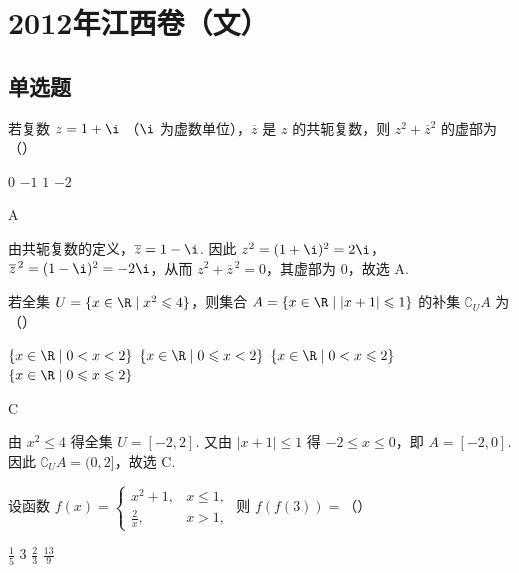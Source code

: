 \chapter{2012年江西卷（文）}

\section{单选题}

\begin{problem}
若复数 \(z = 1 + \i\) （\(\i\) 为虚数单位），\(\overline{z}\) 是 \(z\) 的共轭复数，则 \(z^2 + \overline{z}^2\) 的虚部为（\quad）

\choices
    {\(0\)}
    {\(-1\)}
    {\(1\)}
    {\(-2\)}
\end{problem}

\begin{answer}
A
\end{answer}

\begin{solution}
由共轭复数的定义，\(\overline{z}=1-\i\). 因此
\(z^2=(1+\i)^2=2\i\)，\(\overline{z}^{\,2}=(1-\i)^2=-2\i\)，从而
\(z^2+\overline{z}^{\,2}=0\)，其虚部为 \(0\)，故选 A.
\end{solution}

\begin{problem}
若全集 \(U = \{x \in \R \mid x^2 \leqslant 4\}\)，则集合 \(A = \{x \in \R \mid |x + 1| \leqslant 1\}\) 的补集 \(\complement_U A\) 为（\quad）

\choices
    {\(\{x\in \R\mid 0 < x < 2\}\)}
    {\(\{x\in \R\mid 0\leqslant x < 2\}\)}
    {\(\{x\in \R\mid 0 < x\leqslant 2\}\)}
    {\(\{x\in \R\mid 0\leqslant x\leqslant 2\}\)}
\end{problem}

\begin{answer}
C
\end{answer}

\begin{solution}
由 \(x^2\leqslant4\) 得全集 \(U=[-2,2]\). 又由
\(\lvert x+1\rvert\leqslant1\) 得 \(-2\leqslant x\leqslant0\)，即
\(A=[-2,0]\). 因此
\(\complement_U A=(0,2]\)，故选 C.
\end{solution}

\begin{problem}
设函数 \( f(x) = \begin{cases}
x^2 + 1, & x \leqslant 1,\\
\frac{2}{x}, & x > 1,
\end{cases} \) 则 \( f(f(3)) = \)（\quad）

\choices
    {\(\frac{1}{5}\)}
    {\(3\)}
    {\( \frac{2}{3} \)}
    {\(\frac{13}{9}\)}
\end{problem}

